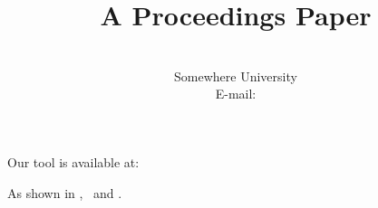 \documentclass{PoS}
\title{A Proceedings Paper}
\author{\speaker{Ann Author}\\ Somewhere University\\ E-mail: \email{ann@x.org}}
\begin{document}
Our tool is available at:
\begin{center}
\end{center}
As shown in \apj, \mnras\ and \aap.
\end{document}
